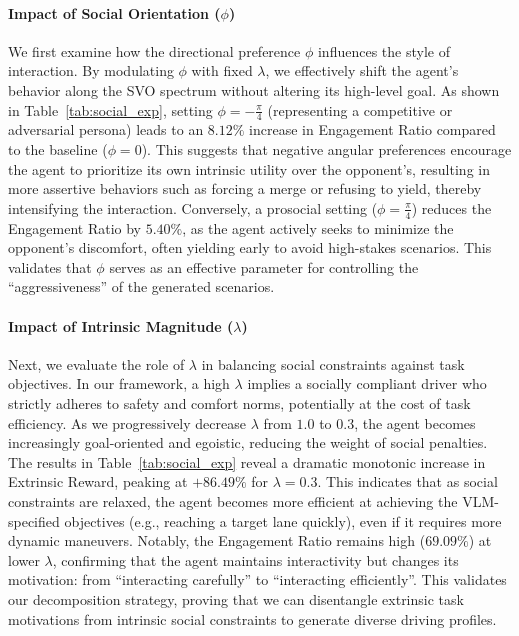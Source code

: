 \paragraph{Impact of Social Orientation ($\phi$)}

We first examine how the directional preference $\phi$ influences the style of interaction. By modulating $\phi$ with fixed $\lambda$, we effectively shift the agent's behavior along the SVO spectrum without altering its high-level goal. As shown in Table~\ref{tab:social_exp}, setting $\phi = -\frac{\pi}{4}$ (representing a competitive or adversarial persona) leads to an $8.12\%$ increase in Engagement Ratio compared to the baseline ($\phi=0$). This suggests that negative angular preferences encourage the agent to prioritize its own intrinsic utility over the opponent's, resulting in more assertive behaviors such as forcing a merge or refusing to yield, thereby intensifying the interaction. Conversely, a prosocial setting ($\phi = \frac{\pi}{4}$) reduces the Engagement Ratio by $5.40\%$, as the agent actively seeks to minimize the opponent's discomfort, often yielding early to avoid high-stakes scenarios. This validates that $\phi$ serves as an effective parameter for controlling the ``aggressiveness'' of the generated scenarios.

\paragraph{Impact of Intrinsic Magnitude ($\lambda$)}

Next, we evaluate the role of $\lambda$ in balancing social constraints against task objectives. In our framework, a high $\lambda$ implies a socially compliant driver who strictly adheres to safety and comfort norms, potentially at the cost of task efficiency. As we progressively decrease $\lambda$ from $1.0$ to $0.3$, the agent becomes increasingly goal-oriented and egoistic, reducing the weight of social penalties. The results in Table~\ref{tab:social_exp} reveal a dramatic monotonic increase in Extrinsic Reward, peaking at $+86.49\%$ for $\lambda=0.3$. This indicates that as social constraints are relaxed, the agent becomes more efficient at achieving the VLM-specified objectives (e.g., reaching a target lane quickly), even if it requires more dynamic maneuvers. Notably, the Engagement Ratio remains high ($69.09\%$) at lower $\lambda$, confirming that the agent maintains interactivity but changes its motivation: from ``interacting carefully'' to ``interacting efficiently''. This validates our decomposition strategy, proving that we can disentangle extrinsic task motivations from intrinsic social constraints to generate diverse driving profiles.



